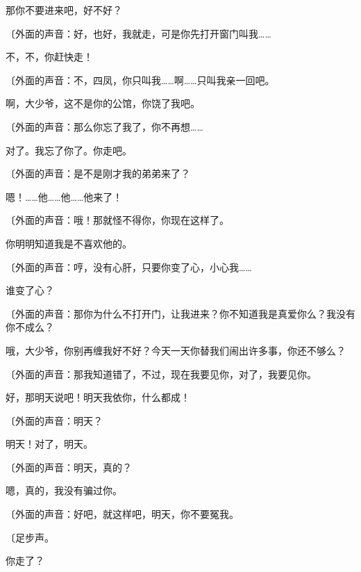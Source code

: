 那你不要进来吧，好不好？

{\fangsong〔外面的声音：好，也好，我就走，可是你先打开窗门叫我……}

不，不，你赶快走！

{\fangsong〔外面的声音：不，四凤，你只叫我……啊……只叫我亲一回吧。}

啊，大少爷，这不是你的公馆，你饶了我吧。

{\fangsong〔外面的声音：那么你忘了我了，你不再想……}

对了。我忘了你了。你走吧。

{\fangsong〔外面的声音：是不是刚才我的弟弟来了？}

嗯！……他……他……他来了！

{\fangsong〔外面的声音：哦！那就怪不得你，你现在这样了。}

你明明知道我是不喜欢他的。

{\fangsong〔外面的声音：哼，没有心肝，只要你变了心，小心我……}

谁变了心？

{\fangsong〔外面的声音：那你为什么不打开门，让我进来？你不知道我是真爱你么？我没有你不成么？}

哦，大少爷，你别再缠我好不好？今天一天你替我们闹出许多事，你还不够么？

{\fangsong〔外面的声音：那我知道错了，不过，现在我要见你，对了，我要见你。}

好，那明天说吧！明天我依你，什么都成！

{\fangsong〔外面的声音：明天？}

明天！对了，明天。

{\fangsong〔外面的声音：明天，真的？}

嗯，真的，我没有骗过你。

{\fangsong〔外面的声音：好吧，就这样吧，明天，你不要冤我。}

{\fangsong〔足步声。}

你走了？

